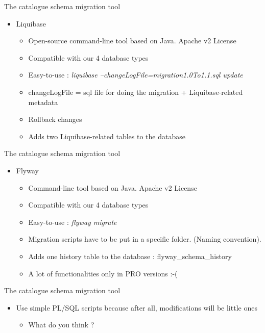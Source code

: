 \documentclass[aspectratio=149]{beamer}
\begin{document}
\begin{frame}{The catalogue schema migration tool}
	\begin{itemize}
		\item Liquibase
		\begin{itemize}
			\item Open-source command-line tool based on Java. Apache v2 License
			\item Compatible with our 4 database types
			\item Easy-to-use : {\small \textit{liquibase --changeLogFile=migration1.0To1.1.sql update}}
			\item changeLogFile = sql file for doing the migration + Liquibase-related metadata
			\item Rollback changes
			\item Adds two Liquibase-related tables to the database
		\end{itemize}
	\end{itemize}
\end{frame}

\begin{frame}{The catalogue schema migration tool}
	\begin{itemize}
		\item Flyway
		\begin{itemize}
			\item Command-line tool based on Java. Apache v2 License
			\item Compatible with our 4 database types
			\item Easy-to-use : {\small \textit{flyway migrate}}
			\item Migration scripts have to be put in a specific folder. (Naming convention).
			\item Adds one history table to the database : flyway\_schema\_history
			\item A lot of functionalities only in PRO versions :-(
		\end{itemize}
	\end{itemize}
\end{frame}

\begin{frame}{The catalogue schema migration tool}
	\begin{itemize}
		\item Use simple PL/SQL scripts because after all, modifications will be little ones
		\begin{itemize}
			\item What do you think ?
		\end{itemize}
	\end{itemize}
\end{frame}
\end{document}
